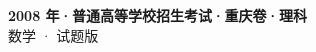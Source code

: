 \documentclass[zihao=-4, a4paper]{ctexart}
\begin{document}
\begin{center}
  {\Large\bfseries 2008 年·普通高等学校招生考试·重庆卷·理科}\\[4pt]
  {\large 数学 · 试题版}
\end{center}
\medskip
{}

\end{document}
